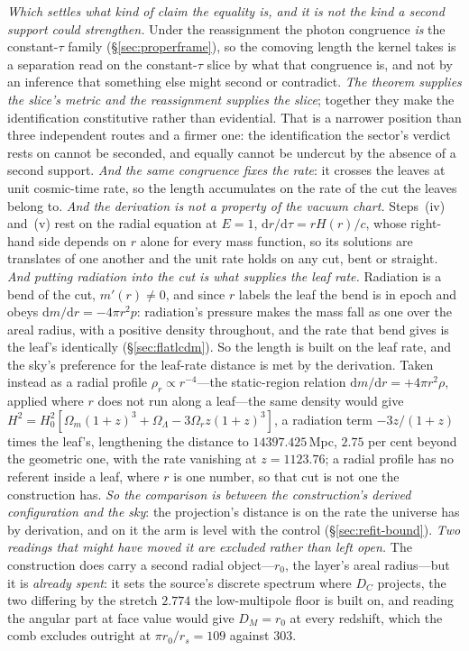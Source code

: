 \documentclass[11pt,a4paper]{article}
\theoremstyle{plain}
\theoremstyle{definition}
\theoremstyle{remark}
\newcommand{\dd}{\mathrm{d}}   %
\begin{document}
\begin{enumerate}
\emph{Which settles what kind of claim the equality is, and it is not the kind a second support could strengthen.} Under the reassignment the photon congruence \emph{is} the constant-$\tau$ family (\S\ref{sec:properframe}), so the comoving length the kernel takes is a separation read on the constant-$\tau$ slice by what that congruence is, and not by an inference that something else might second or contradict. \emph{The theorem supplies the slice's metric and the reassignment supplies the slice}; together they make the identification constitutive rather than evidential. That is a narrower position than three independent routes and a firmer one: the identification the sector's verdict rests on cannot be seconded, and equally cannot be undercut by the absence of a second support. \emph{And the same congruence fixes the rate}: it crosses the leaves at unit cosmic-time rate, so the length accumulates on the rate of the cut the leaves belong to. \emph{And the derivation is not a property of the vacuum chart.} Steps~(iv) and~(v) rest on the radial equation at $E=1$, $\dd r/\dd\tau=rH(r)/c$, whose right-hand side depends on $r$ alone for every mass function, so its solutions are translates of one another and the unit rate holds on any cut, bent or straight. \emph{And putting radiation into the cut is what supplies the leaf rate.} Radiation is a bend of the cut, $m'(r)\neq0$, and since $r$ labels the leaf the bend is in epoch and obeys $\dd m/\dd r=-4\pi r^{2}p$: radiation's pressure makes the mass fall as one over the areal radius, with a positive density throughout, and the rate that bend gives is the leaf's identically (\S\ref{sec:flatlcdm}). So the length is built on the leaf rate, and the sky's preference for the leaf-rate distance is met by the derivation. Taken instead as a radial profile $\rho_r\propto r^{-4}$---the static-region relation $\dd m/\dd r=+4\pi r^{2}\rho$, applied where $r$ does not run along a leaf---the same density would give $H^2=H_0^2[\Omega_m(1+z)^3+\Omega_\Lambda-3\Omega_r z(1+z)^3]$, a radiation term $-3z/(1+z)$ times the leaf's, lengthening the distance to $14397.425$\,Mpc, $2.75$ per cent beyond the geometric one, with the rate vanishing at $z=1123.76$; a radial profile has no referent inside a leaf, where $r$ is one number, so that cut is not one the construction has. \emph{So the comparison is between the construction's derived configuration and the sky}: the projection's distance is on the rate the universe has by derivation, and on it the arm is level with the control (\S\ref{sec:refit-bound}). \emph{Two readings that might have moved it are excluded rather than left open.} The construction does carry a second radial object---$r_0$, the layer's areal radius---but it is \emph{already spent}: it sets the source's discrete spectrum where $D_C$ projects, the two differing by the stretch $2.774$ the low-multipole floor is built on, and reading the angular part at face value would give $D_M=r_0$ at every redshift, which the comb excludes outright at $\pi r_0/r_s=109$ against $303$. 
\end{enumerate}
\end{document}
